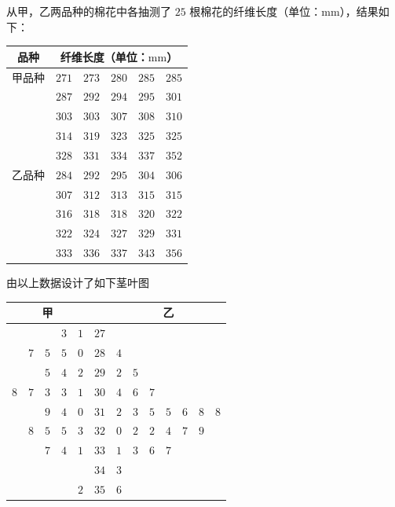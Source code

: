 \begin{problem}
从甲，乙两品种的棉花中各抽测了 \(25\) 根棉花的纤维长度（单位：\(\mathrm{mm}\)），结果如下：

\begin{center}
\begin{tabular}{c|ccccc}
\hline
品种 & \multicolumn{5}{c}{纤维长度（单位：\(\mathrm{mm}\)）} \\
\hline
甲品种 & \(271\) & \(273\) & \(280\) & \(285\) & \(285\) \\
 & \(287\) & \(292\) & \(294\) & \(295\) & \(301\) \\
 & \(303\) & \(303\) & \(307\) & \(308\) & \(310\) \\
 & \(314\) & \(319\) & \(323\) & \(325\) & \(325\) \\
 & \(328\) & \(331\) & \(334\) & \(337\) & \(352\) \\
\hline
乙品种 & \(284\) & \(292\) & \(295\) & \(304\) & \(306\) \\
 & \(307\) & \(312\) & \(313\) & \(315\) & \(315\) \\
 & \(316\) & \(318\) & \(318\) & \(320\) & \(322\) \\
 & \(322\) & \(324\) & \(327\) & \(329\) & \(331\) \\
 & \(333\) & \(336\) & \(337\) & \(343\) & \(356\) \\
\hline
\end{tabular}
\end{center}

由以上数据设计了如下茎叶图

\begin{center}
\begin{tabular}{rrrrr|c|lllllll}
\multicolumn{5}{c|}{甲} & & \multicolumn{7}{c}{乙} \\
\hline
 &  &  & \(3\) & \(1\) & \(27\) &  &  &  &  &  &  &  \\
 & \(7\) & \(5\) & \(5\) & \(0\) & \(28\) & \(4\) &  &  &  &  &  &  \\
 &  & \(5\) & \(4\) & \(2\) & \(29\) & \(2\) & \(5\) &  &  &  &  &  \\
\(8\) & \(7\) & \(3\) & \(3\) & \(1\) & \(30\) & \(4\) & \(6\) & \(7\) &  &  &  &  \\
 &  & \(9\) & \(4\) & \(0\) & \(31\) & \(2\) & \(3\) & \(5\) & \(5\) & \(6\) & \(8\) & \(8\) \\
 & \(8\) & \(5\) & \(5\) & \(3\) & \(32\) & \(0\) & \(2\) & \(2\) & \(4\) & \(7\) & \(9\) &  \\
 &  & \(7\) & \(4\) & \(1\) & \(33\) & \(1\) & \(3\) & \(6\) & \(7\) &  &  &  \\
 &  &  &  &  & \(34\) & \(3\) &  &  &  &  &  &  \\
 &  &  &  & \(2\) & \(35\) & \(6\) &  &  &  &  &  &  \\
\end{tabular}
\end{center}


\end{problem}
